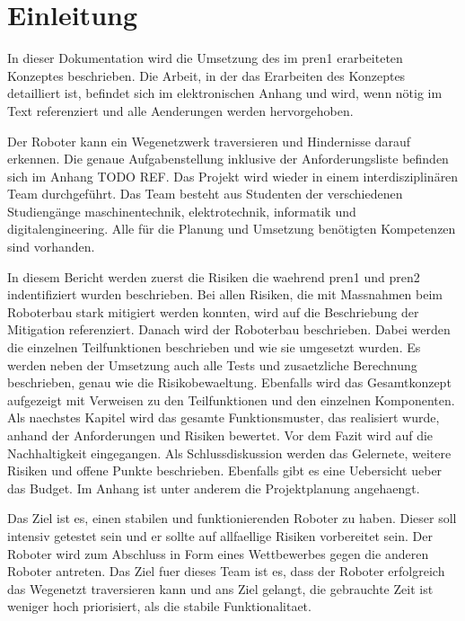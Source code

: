 \section{Einleitung}

In dieser Dokumentation wird die Umsetzung des im \acrfull{pren1} erarbeiteten Konzeptes beschrieben. 
Die Arbeit, in der das Erarbeiten des Konzeptes detailliert ist, befindet sich im elektronischen Anhang und wird, wenn nötig im Text referenziert und alle Aenderungen werden hervorgehoben.

Der Roboter kann ein Wegenetzwerk traversieren und Hindernisse darauf erkennen. Die genaue Aufgabenstellung inklusive der Anforderungsliste befinden sich im Anhang TODO REF. Das Projekt wird wieder in einem interdisziplinären Team durchgeführt. Das Team besteht aus Studenten der verschiedenen Studiengänge \acrfull{maschinentechnik}, \acrfull{elektrotechnik}, \acrfull{informatik} und \acrfull{digitalengineering}. Alle für die Planung und Umsetzung benötigten Kompetenzen sind vorhanden.

In diesem Bericht werden zuerst die Risiken die waehrend \acrshort{pren1} und \acrshort{pren2} indentifiziert wurden beschrieben. Bei allen Risiken, die mit Massnahmen beim Roboterbau stark mitigiert werden konnten, wird auf die Beschriebung der Mitigation referenziert. Danach wird der Roboterbau beschrieben. Dabei werden die einzelnen Teilfunktionen beschrieben und wie sie umgesetzt wurden. Es werden neben der Umsetzung auch alle Tests und zusaetzliche Berechnung beschrieben, genau wie die Risikobewaeltung. Ebenfalls wird das Gesamtkonzept aufgezeigt mit Verweisen zu den Teilfunktionen und den einzelnen Komponenten. Als naechstes Kapitel wird das gesamte Funktionsmuster, das realisiert wurde, anhand der Anforderungen und Risiken bewertet. Vor dem Fazit wird auf die Nachhaltigkeit eingegangen. Als Schlussdiskussion werden das Gelernete, weitere Risiken und offene Punkte beschrieben. Ebenfalls gibt es eine Uebersicht ueber das Budget. Im Anhang ist unter anderem die Projektplanung angehaengt.


Das Ziel ist es, einen stabilen und funktionierenden Roboter zu haben. Dieser soll intensiv getestet sein und er sollte auf allfaellige Risiken vorbereitet sein. Der Roboter wird zum Abschluss in Form eines Wettbewerbes gegen die anderen Roboter antreten. Das Ziel fuer dieses Team ist es, dass der Roboter erfolgreich das Wegenetzt traversieren kann und ans Ziel gelangt, die gebrauchte Zeit ist weniger hoch priorisiert, als die stabile Funktionalitaet.
